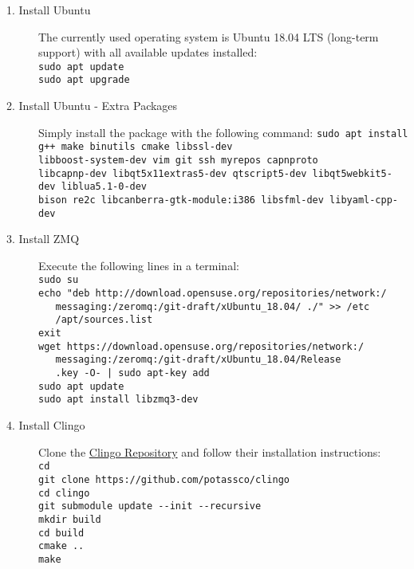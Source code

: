 \begin{description}
	\item[1. Install Ubuntu] The currently used operating system is Ubuntu 18.04 LTS (long-term support) with all available updates installed:\\
	\verb#sudo apt update#\\
  \verb#sudo apt upgrade#
	\item[2. Install Ubuntu - Extra Packages] Simply install the package with the following command: \verb#sudo apt install g++ make binutils cmake libssl-dev#\\
	\verb#libboost-system-dev vim git ssh myrepos capnproto#\\
	\verb#libcapnp-dev libqt5x11extras5-dev qtscript5-dev libqt5webkit5-dev liblua5.1-0-dev#\\
	\verb#bison re2c libcanberra-gtk-module:i386 libsfml-dev libyaml-cpp-dev#	
	\item[3. Install ZMQ] Execute the following lines in a terminal:\\
\verb#sudo su#\\
\verb#echo "deb http://download.opensuse.org/repositories/network:/#\\\verb#   messaging:/zeromq:/git-draft/xUbuntu_18.04/ ./" >> /etc#\\\verb#   /apt/sources.list#\\
\verb#exit#\\
\verb#wget https://download.opensuse.org/repositories/network:/#\\\verb#   messaging:/zeromq:/git-draft/xUbuntu_18.04/Release#\\\verb#   .key -O- | sudo apt-key add#\\
\verb#sudo apt update#\\
\verb#sudo apt install libzmq3-dev#
	\item[4. Install Clingo] Clone the \href{https://github.com/potassco/clingo}{Clingo Repository} and follow their installation instructions:\\
\verb#cd#\\
\verb#git clone https://github.com/potassco/clingo#\\
\verb#cd clingo#\\
\verb#git submodule update --init --recursive#\\
\verb#mkdir build#\\
\verb#cd build#\\
\verb#cmake ..#\\
\verb#make#\\

\end{description}
